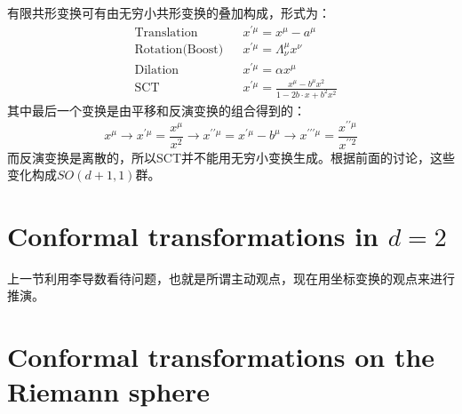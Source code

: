 	有限共形变换可有由无穷小共形变换的叠加构成，形式为：
	\begin{equation}
		\boxed{
			\begin{aligned}
				&\text{Translation}&&x^{\prime \mu}=x^{\mu}-a^{\mu}\\
				&\text{Rotation(Boost)}&&x^{\prime \mu}=\Lambda_{\nu}^{\mu} x^{\nu}\\
				&\text{Dilation}&&x^{\prime \mu}=\alpha x^{\mu}\\
				&\text{SCT}&&x^{\prime \mu}=\frac{x^{\mu}-b^{\mu} x^{2}}{1-2 b\cdot x+b^{2} x^{2}}
			\end{aligned}
		}
	\end{equation}
	其中最后一个变换是由平移和反演变换的组合得到的：
		\begin{equation}
		x^{\mu} \rightarrow x^{\prime \mu}=\frac{x^{\mu}}{x^{2}} \rightarrow x^{\prime \prime \mu}=x^{\prime \mu}-b^{\mu} \rightarrow x^{\prime \prime \prime \mu}=\frac{x^{\prime \prime \mu}}{x^{\prime \prime 2}}
	\end{equation}
	而反演变换是离散的，所以SCT并不能用无穷小变换生成。根据前面的讨论，这些变化构成$SO(d+1,1)$群。
\section{Conformal transformations in $d=2$}
	上一节利用李导数看待问题，也就是所谓主动观点，现在用坐标变换的观点来进行推演。
	
\section{Conformal transformations on the Riemann sphere}

